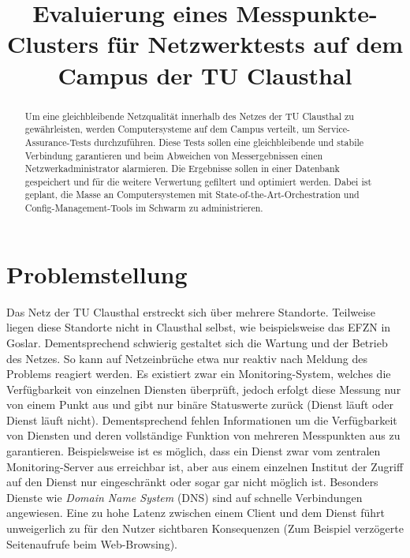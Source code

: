 \documentclass[conference]{IEEEtran}
\begin{document}
\title{Evaluierung eines Messpunkte-Clusters für Netzwerktests auf dem
Campus der TU Clausthal}
\author{
}

\maketitle

\begin{abstract}
Um eine gleichbleibende Netzqualität innerhalb des Netzes der
TU Clausthal zu gewährleisten, werden Computersysteme auf dem
Campus verteilt, um Service-Assurance-Tests durchzuführen. Diese
Tests sollen eine gleichbleibende und stabile Verbindung garantieren
und beim Abweichen von Messergebnissen einen Netzwerkadministrator
alarmieren. Die Ergebnisse sollen in einer Datenbank gespeichert und
für die weitere Verwertung gefiltert und optimiert
werden. Dabei ist geplant, die Masse an Computersystemen mit
State-of-the-Art-Orchestration und Config-Management-Tools im
Schwarm zu administrieren.
\end{abstract}

\IEEEpeerreviewmaketitle

\section*{Problemstellung}
Das Netz der TU Clausthal erstreckt sich über mehrere Standorte.
Teilweise liegen diese Standorte nicht in Clausthal selbst, wie
beispielsweise das EFZN in Goslar. Dementsprechend schwierig gestaltet
sich die Wartung und der Betrieb des Netzes. So kann auf Netzeinbrüche
etwa nur reaktiv nach Meldung des Problems reagiert werden. Es existiert
zwar ein Monitoring-System, welches die Verfügbarkeit von einzelnen
Diensten überprüft, jedoch erfolgt diese Messung nur von einem Punkt aus
und gibt nur binäre Statuswerte zurück (Dienst läuft oder Dienst läuft
nicht). Dementsprechend fehlen Informationen um die Verfügbarkeit von
Diensten und deren vollständige Funktion von mehreren Messpunkten aus zu
garantieren. Beispielsweise ist es möglich, dass ein Dienst zwar vom
zentralen Monitoring-Server aus erreichbar ist, aber aus einem einzelnen
Institut der Zugriff auf den Dienst nur eingeschränkt oder sogar gar
nicht möglich ist. Besonders Dienste wie \textit{Domain Name System}
(DNS) sind auf schnelle Verbindungen angewiesen. Eine zu hohe Latenz
zwischen einem Client und dem Dienst führt unweigerlich zu für den
Nutzer sichtbaren Konsequenzen (Zum Beispiel verzögerte Seitenaufrufe beim
Web-Browsing).
\end{document}
